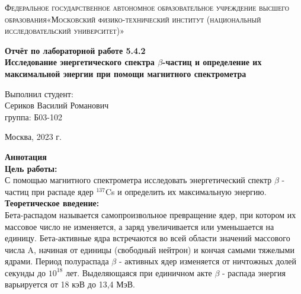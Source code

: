 \documentclass[a4paper, 12pt]{article}%
\begin{document}
	\begin{titlepage}
		\begin{center}
			\textsc{Федеральное государственное автономное образовательное учреждение высшего образования«Московский физико-технический институт (национальный исследовательский университет)»\\[5mm]
			}
			
			\vfill
			
			\textbf{Отчёт по лабораторной работе 5.4.2\\[3mm]
				Исследование энергетического спектра $\beta$-частиц
				и определение их максимальной энергии при помощи
				магнитного спектрометра
				\\[50mm]
			}
			
		\end{center}
		
		\hfill
		\begin{minipage}{.5\textwidth}
			Выполнил студент:\\[2mm]
			Сериков Василий Романович\\[2mm]
			группа: Б03-102\\[5mm]
			
		\end{minipage}
		\vfill
		\begin{center}
			Москва, 2023 г.
		\end{center}
		
	\end{titlepage}
	
	\newpage
	\setcounter{page}{2}
	\textbf{Аннотация}\\
	
	\textbf{Цель работы: }\\
	
	 С помощью магнитного спектрометра исследовать энергетический спектр $\beta$ - частиц при распаде ядер $^{137}$Cs  и определить их максимальную энергию.\\ 
	
	\textbf{Теоретическое введение: }\\
	
	Бета-распадом называется самопроизвольное превращение ядер, при котором их массовое число не изменяется, а заряд увеличивается или уменьшается на единицу. Бета-активные ядра встречаются во всей области значений массового числа A, начиная от единицы (свободный нейтрон) и кончая самыми тяжелыми ядрами. Период полураспада $\beta$ - активных ядер изменяется от ничтожных долей секунды до $10^{18}$ лет. Выделяющаяся при единичном акте $\beta$ - распада энергия варьируется от 18 кэВ до 13,4 МэВ.
	
\end{document}
